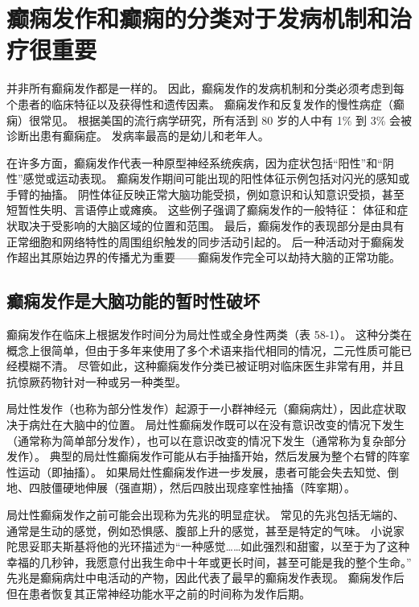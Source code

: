 \section{癫痫发作和癫痫的分类对于发病机制和治疗很重要}

并非所有癫痫发作都是一样的。
因此，癫痫发作的发病机制和分类必须考虑到每个患者的临床特征以及获得性和遗传因素。
癫痫发作和反复发作的慢性病症（癫痫）很常见。
根据美国的流行病学研究，所有活到 80 岁的人中有 1\% 到 3\% 会被诊断出患有癫痫症。
发病率最高的是幼儿和老年人。


在许多方面，癫痫发作代表一种原型神经系统疾病，因为症状包括“阳性”和“阴性”感觉或运动表现。
癫痫发作期间可能出现的阳性体征示例包括对闪光的感知或手臂的抽搐。
阴性体征反映正常大脑功能受损，例如意识和认知意识受损，甚至短暂性失明、言语停止或瘫痪。
这些例子强调了癫痫发作的一般特征：
体征和症状取决于受影响的大脑区域的位置和范围。
最后，癫痫发作的表现部分是由具有正常细胞和网络特性的周围组织触发的同步活动引起的。
后一种活动对于癫痫发作超出其原始边界的传播尤为重要——癫痫发作完全可以劫持大脑的正常功能。



\subsection{癫痫发作是大脑功能的暂时性破坏}

癫痫发作在临床上根据发作时间分为局灶性或全身性两类（表 58-1）。
这种分类在概念上很简单，但由于多年来使用了多个术语来指代相同的情况，二元性质可能已经模糊不清。
尽管如此，这种癫痫发作分类已被证明对临床医生非常有用，并且抗惊厥药物针对一种或另一种类型。


局灶性发作（也称为部分性发作）起源于一小群神经元（癫痫病灶），因此症状取决于病灶在大脑中的位置。
局灶性癫痫发作既可以在没有意识改变的情况下发生（通常称为简单部分发作），也可以在意识改变的情况下发生（通常称为复杂部分发作）。
典型的局灶性癫痫发作可能从右手抽搐开始，然后发展为整个右臂的阵挛性运动（即抽搐）。
如果局灶性癫痫发作进一步发展，患者可能会失去知觉、倒地、四肢僵硬地伸展（强直期），然后四肢出现痉挛性抽搐（阵挛期）。


局灶性癫痫发作之前可能会出现称为先兆的明显症状。
常见的先兆包括无端的、通常是生动的感觉，例如恐惧感、腹部上升的感觉，甚至是特定的气味。
小说家陀思妥耶夫斯基将他的光环描述为“一种感觉……如此强烈和甜蜜，以至于为了这种幸福的几秒钟，我愿意付出我生命中十年或更长时间，甚至可能是我的整个生命。” 
先兆是癫痫病灶中电活动的产物，因此代表了最早的癫痫发作表现。
癫痫发作后但在患者恢复其正常神经功能水平之前的时间称为发作后期。


